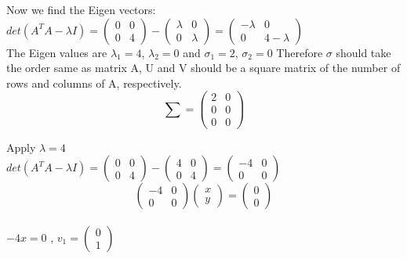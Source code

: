 \documentclass[12pt, oneside]{article}   	%
\begin{document}
\begin{enumerate}
	Now we find the Eigen vectors:
	$det(A^TA- \lambda I)= \left( \begin{array}{cc} 0 & 0 \\ 0 & 4  \end{array} \right)- \left( \begin{array}{cc} \lambda & 0 \\ 0 & \lambda  \end{array} \right) =\left( \begin{array}{cc} -\lambda & 0 \\ 0 & 4-\lambda  \end{array} \right)$\\
	
	
	The Eigen values are $\lambda_1=4$, $\lambda_2=0$ and  $\sigma_1=2$, $\sigma_2=0$ Therefore $\sigma$ should take the order same as matrix A, U and V should be a square matrix of the number of rows and columns of A, respectively. 
	$$
	\sum =\left( \begin{array}{cc} 2 & 0 \\ 0 & 0 \\0&0 \end{array} \right) 
	$$
	
	Apply $\lambda= 4$\\
	$det(A^TA- \lambda I)= \left( \begin{array}{cc} 0 & 0 \\ 0 & 4  \end{array} \right)- \left( \begin{array}{cc} 4 & 0 \\ 0 & 4  \end{array} \right) =\left( \begin{array}{cc} -4 & 0 \\ 0 & 0  \end{array} \right)$\\

	
	$$\left( \begin{array}{cc} -4 & 0 \\ 0 & 0  \end{array} \right) \left( \begin{array}{c} x \\ y \end{array} \right) =\left( \begin{array}{c} 0 \\ 0  \end{array} \right)$$ \\
	
	$-4x=0$ , $v_1= \left( \begin{array}{c} 0 \\ 1  \end{array} \right)$\\
	

\end{enumerate}
\end{document}
